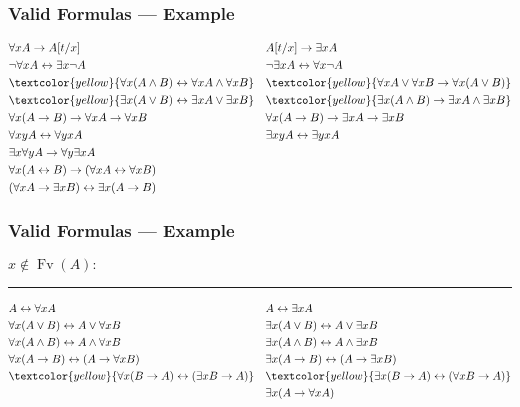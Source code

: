 \documentclass[UTF8,aspectratio=43,11pt,colorlinks,compress,openany]{beamer}%
\begin{document}
\begin{frame}\frametitle{Valid Formulas --- Example}
	\begin{align*}
	&\forall x A\to A[t/x] && A[t/x]\to\exists x A\\
	&\neg\forall x A\leftrightarrow\exists x\neg A &&\neg\exists x A\leftrightarrow\forall x\neg A\\
	&\textcolor{yellow}{\forall x(A\wedge B)\leftrightarrow\forall x A\wedge\forall x B} &&\textcolor{yellow}{\forall x A\vee\forall x B\to\forall x(A\vee B)}\\
	&\textcolor{yellow}{\exists x(A\vee B)\leftrightarrow\exists x A\vee\exists x B} &&\textcolor{yellow}{\exists x(A\wedge B)\to\exists x A\wedge\exists x B}\\
	&\forall x(A\to B)\to\forall x A\to\forall x B &&\forall x(A\to B)\to\exists x A\to\exists x B\\
	&\forall xy A\leftrightarrow\forall yx A &&\exists xy A\leftrightarrow\exists yx A\\
	&\exists x\forall y A\to\forall y\exists x A &&\\
	&\forall x(A\leftrightarrow B)\to(\forall x A\leftrightarrow\forall x B) &&\\
	&(\forall x A\to\exists x B)\leftrightarrow\exists x(A\to B)&&
	\end{align*}
\end{frame}

\begin{frame}\frametitle{Valid Formulas --- Example}
	$x\notin \operatorname{Fv}(A):$
	\hrule
	\begin{align*}
	& A\leftrightarrow\forall x A && A\leftrightarrow\exists x A\\
	&\forall x(A\vee B)\leftrightarrow A\vee\forall x B &&\exists x(A\vee B)\leftrightarrow A\vee\exists x B\\
	&\forall x(A\wedge B)\leftrightarrow A\wedge\forall x B &&\exists x(A\wedge B)\leftrightarrow A\wedge\exists x B\\
	&\forall x(A\to B)\leftrightarrow(A\to\forall x B) &&\exists x(A\to B)\leftrightarrow(A\to\exists x B)\\
	&\textcolor{yellow}{\forall x(B\to A)\leftrightarrow(\exists x B\to A)} &&\textcolor{yellow}{\exists x(B\to A)\leftrightarrow(\forall x B\to A)}\\
	&&&\exists x(A\to\forall x A)
	\end{align*}
\end{frame}
\end{document}
